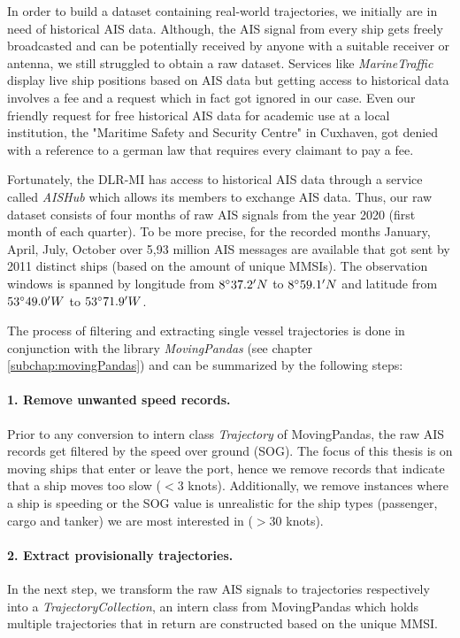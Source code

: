 In order to build a dataset containing real-world trajectories, we initially are in need of historical AIS data. Although, the AIS signal from every ship gets freely broadcasted and can be potentially received by anyone with a suitable receiver or antenna, we still struggled to obtain a raw dataset. Services like \textit{MarineTraffic} display live ship positions based on AIS data but getting access to historical data involves a fee and a request which in fact got ignored in our case. Even our friendly request for free historical AIS data for academic use at a local institution, the "Maritime Safety and Security Centre" in Cuxhaven, got denied with a reference to a german law that requires every claimant to pay a fee.
\par
Fortunately, the DLR-MI has access to historical AIS data through a service called \textit{AISHub} which allows its members to exchange AIS data. Thus, our raw dataset consists of four months of raw AIS signals from the year 2020 (first month of each quarter). To be more precise, for the recorded months January, April, July, October over 5,93 million AIS messages are available that got sent by 2011 distinct ships (based on the amount of unique MMSIs). The observation windows is spanned by longitude from $8\degree37.2'N$ to $8\degree59.1'N$ and latitude from $53\degree49.0'W$ to $53\degree71.9'W$.
\par
The process of filtering and extracting single vessel trajectories is done  in  conjunction  with  the  library \textit{MovingPandas} (see chapter \ref{subchap:movingPandas}) and can be summarized by the following steps:
\paragraph{1. Remove unwanted speed records.}
Prior to any conversion to intern class \textit{Trajectory} of MovingPandas, the raw AIS records get filtered by the speed over ground (SOG). The focus of this thesis is on moving ships that enter or leave the port, hence we remove records that indicate that a ship moves too slow ($<3$ knots). Additionally, we remove instances where a ship is speeding or the SOG value is unrealistic for the ship types (passenger, cargo and tanker) we are most interested in ($>30$ knots).


\paragraph{2. Extract provisionally trajectories.}
In the next step, we transform the raw AIS signals to trajectories respectively into a \textit{TrajectoryCollection}, an intern class from MovingPandas which holds multiple trajectories that in return are constructed based on the unique MMSI. 

